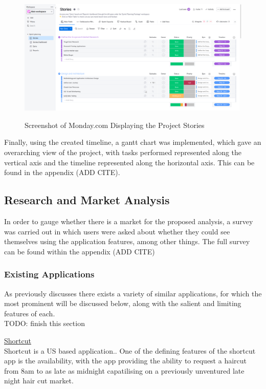 \documentclass[12pt]{article}
\begin{document}
	\begin{figure}[H]
		\centering
		\includegraphics[scale=0.25]{images/monday.png}
		\caption{Screenshot of Monday.com Displaying the Project Stories}
		\label{fig:monday.com}
		\cite{MondayHome2021}
	\end{figure}

	Finally, using the created timeline, a gantt chart was implemented, which gave an overarching view of the project, with tasks performed represented along the vertical axis and the timeline represented along the horizontal axis. This can be found in the appendix (ADD CITE).
	
	\subsection{Research and Market Analysis}
	In order to gauge whether there is a market for the proposed analysis, a survey was carried out in which users were asked about whether they could see themselves using the application features, among other things. The full survey can be found within the appendix (ADD CITE)
	
	\subsubsection{Existing Applications}
	As previously discusses there exists a variety of similar applications, for which the most prominent will be discussed below, along with the salient and limiting features of each.
	\\
	TODO: finish this section
	
	\noindent
	\underline{Shortcut}
	\\
	Shortcut is a US based application..
	One of the defining features of the shortcut app is the availability, with the app providing the ability to request a haircut from 8am to as late as midnight capatilising on a previously unventured late night hair cut market.
	
\end{document}
